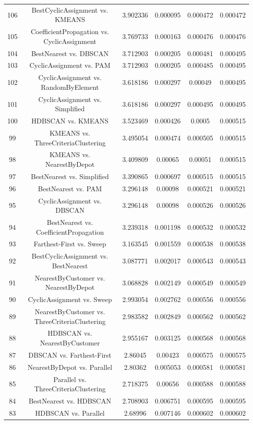 \documentclass[a4paper,10pt]{article}
\begin{document}
\begin{landscape}
\begin{table}[!htp]
\begin{tabular}{cccccc}
106&BestCyclicAssignment vs. KMEANS&3.902336&0.000095&0.000472&0.000472\\
105&CoefficientPropagation vs. CyclicAssignment&3.769733&0.000163&0.000476&0.000476\\
104&BestNearest vs. DBSCAN&3.712903&0.000205&0.000481&0.000495\\
103&CyclicAssignment vs. PAM&3.712903&0.000205&0.000485&0.000495\\
102&CyclicAssignment vs. RandomByElement&3.618186&0.000297&0.00049&0.000495\\
101&CyclicAssignment vs. Simplified&3.618186&0.000297&0.000495&0.000495\\
100&HDBSCAN vs. KMEANS&3.523469&0.000426&0.0005&0.000515\\
99&KMEANS vs. ThreeCriteriaClustering&3.495054&0.000474&0.000505&0.000515\\
98&KMEANS vs. NearestByDepot&3.409809&0.00065&0.00051&0.000515\\
97&BestNearest vs. Simplified&3.390865&0.000697&0.000515&0.000515\\
96&BestNearest vs. PAM&3.296148&0.00098&0.000521&0.000521\\
95&CyclicAssignment vs. DBSCAN&3.296148&0.00098&0.000526&0.000526\\
94&BestNearest vs. CoefficientPropagation&3.239318&0.001198&0.000532&0.000532\\
93&Farthest-First vs. Sweep&3.163545&0.001559&0.000538&0.000538\\
92&BestCyclicAssignment vs. BestNearest&3.087771&0.002017&0.000543&0.000543\\
91&NearestByCustomer vs. NearestByDepot&3.068828&0.002149&0.000549&0.000549\\
90&CyclicAssignment vs. Sweep&2.993054&0.002762&0.000556&0.000556\\
89&NearestByCustomer vs. ThreeCriteriaClustering&2.983582&0.002849&0.000562&0.000562\\
88&HDBSCAN vs. NearestByCustomer&2.955167&0.003125&0.000568&0.000568\\
87&DBSCAN vs. Farthest-First&2.86045&0.00423&0.000575&0.000575\\
86&NearestByDepot vs. Parallel&2.80362&0.005053&0.000581&0.000581\\
85&Parallel vs. ThreeCriteriaClustering&2.718375&0.00656&0.000588&0.000588\\
84&BestNearest vs. HDBSCAN&2.708903&0.006751&0.000595&0.000595\\
83&HDBSCAN vs. Parallel&2.68996&0.007146&0.000602&0.000602\\

\end{tabular}
\end{table}
\end{landscape}
\end{document}
